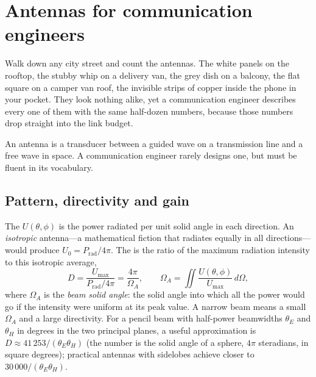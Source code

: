 \section{Antennas for communication engineers}
\label{sec:ch11:antennas}

Walk down any city street and count the antennas. The white panels on the rooftop, the stubby
whip on a delivery van, the grey dish on a balcony, the flat square on a camper van roof, the
invisible strips of copper inside the phone in your pocket. They look nothing alike, yet a
communication engineer describes every one of them with the same half-dozen numbers, because
those numbers drop straight into the link budget.

An antenna is a transducer between a guided wave on a transmission line and a free wave in
space. A communication engineer rarely designs one, but must be fluent in its vocabulary.

\subsection{Pattern, directivity and gain}

The  $U(\theta,\phi)$ is the power radiated per unit solid angle in
each direction. An \emph{isotropic} antenna---a mathematical fiction that radiates equally
in all directions---would produce $U_0=P_{\text{rad}}/4\pi$. The  is the ratio
of the maximum radiation intensity to this isotropic average,
\begin{equation}
D=\frac{U_{\max}}{P_{\text{rad}}/4\pi}=\frac{4\pi}{\Omega_A},
\qquad
\Omega_A=\iint\frac{U(\theta,\phi)}{U_{\max}}\,d\Omega ,
\end{equation}
where $\Omega_A$ is the \emph{beam solid angle}: the solid angle into which all the power would
go if the intensity were uniform at its peak value. A narrow beam means a small $\Omega_A$ and
a large directivity. For a pencil beam with half-power beamwidths $\theta_E$ and $\theta_H$
in degrees in the two principal planes, a useful approximation is
$D\approx 41\,253/(\theta_E\theta_H)$ (the number is the solid angle of a sphere, $4\pi$
steradians, in square degrees); practical antennas with sidelobes achieve closer to
$30\,000/(\theta_E\theta_H)$.


